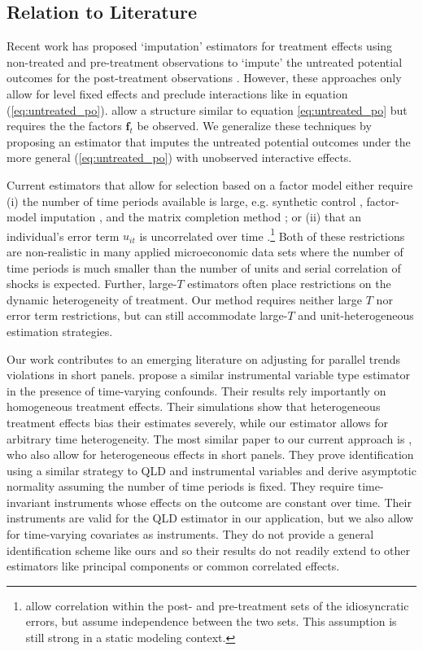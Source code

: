 \documentclass[12pt]{article}
\begin{document}
\subsection*{Relation to Literature}

Recent work has proposed `imputation' estimators for treatment effects using non-treated and pre-treatment observations to `impute' the untreated potential outcomes for the post-treatment observations \citep[e.g.][]{Borusyak_Jaravel_Spiess_2021,Gardner_2021,Wooldridge_2021}. However, these approaches only allow for level fixed effects and preclude interactions like in equation (\ref{eq:untreated_po}). \citet{Borusyak_Jaravel_Spiess_2021} allow a structure similar to equation \eqref{eq:untreated_po} but requires the the factors $\bm f_t$ be observed. We generalize these techniques by proposing an estimator that imputes the untreated potential outcomes under the more general (\ref{eq:untreated_po}) with unobserved interactive effects.

Current estimators that allow for selection based on a factor model either require (i) the number of time periods available is large, e.g. synthetic control \citep{Abadie_2021}, factor-model imputation \citep{Xu_2017,Gobillon_Magnac_2016}, and the matrix completion method  \citep{Athey_et_al_2021}; or (ii) that an individual's error term $u_{it}$ is uncorrelated over time \citep{Imbens_Kallus_Mao_2021}.\footnote{\citet{Imbens_Kallus_Mao_2021} allow correlation within the post- and pre-treatment sets of the idiosyncratic errors, but assume independence between the two sets. This assumption is still strong in a static modeling context.} Both of these restrictions are non-realistic in many applied microeconomic data sets where the number of time periods is much smaller than the number of units and serial correlation of shocks is expected. Further, large-$T$ estimators often place restrictions on the dynamic heterogeneity of treatment. Our method requires neither large $T$ nor error term restrictions, but can still accommodate large-$T$ and unit-heterogeneous estimation strategies.

Our work contributes to an emerging literature on adjusting for parallel trends violations in short panels. \citet{freyaldenhoven2019pre} propose a similar instrumental variable type estimator in the presence of time-varying confounds. Their results rely importantly on homogeneous treatment effects. Their simulations show that heterogeneous treatment effects bias their estimates severely, while our estimator allows for arbitrary time heterogeneity. The most similar paper to our current approach is \citet{Callaway_Karami_2020}, who also allow for heterogeneous effects in short panels. They prove identification using a similar strategy to QLD and instrumental variables and derive asymptotic normality assuming the number of time periods is fixed. They require time-invariant instruments whose effects on the outcome are constant over time. Their instruments are valid for the QLD estimator in our application, but we also allow for time-varying covariates as instruments. They do not provide a general identification scheme like ours and so their results do not readily extend to other estimators like principal components or common correlated effects.
\end{document}
